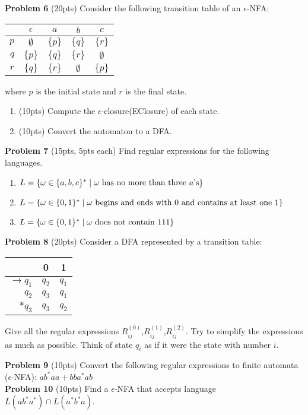 \documentclass{article}
\begin{document}
\noindent \textbf{Problem 6} (20pts) Consider the following transition table of an $\epsilon$-NFA:
    \begin{center}
    \small
        \begin{tabular}{r||c|c|c|c}
        & $\epsilon$ & $a$ & $b$ & $c$\\ \hline\hline
        $p$ & $\emptyset$ & $\{p\}$ & $\{q\}$ & $\{r\}$\\ 
        $q$ & $\{p\}$ & $\{q\}$ & $\{r\}$ & $\emptyset$\\ 
        $r$ & $\{q\}$ & $\{r\}$ & $\emptyset$ & $\{p\}$\\ 
        \end{tabular}
    \end{center}
    where $p$ is the initial state and $r$ is the final state.
    \begin{enumerate}
        \item (10pts) Compute the $\epsilon$-closure(EClosure) of each state.
        \item (10pts) Convert the automaton to a DFA.
    \end{enumerate}
    
\noindent \textbf{Problem 7} (15pts, 5pts each) Find regular expressions for the following languages.
\begin{enumerate}
    \item $L = \{ \omega \in \{ a,b,c \}^* \mid \omega \mbox{ has no more than three $a$'s} \}$
    \item $L = \{ \omega \in \{ 0,1 \}^* \mid \omega \mbox{ begins and ends with 0 and contains at least one 1} \}$
    \item $L = \{ \omega \in \{ 0,1 \}^* \mid \omega \mbox{ does not contain 111} \}$ 
\end{enumerate}

\noindent \textbf{Problem 8} (20pts) Consider a DFA represented by a transition table:
\begin{center}
\small
\begin{tabular}{r|c|c}
& 0 & 1 \\ \hline
$\rightarrow q_1$ & $q_2$ & $q_1$ \\ 
$q_2$ & $q_3$ & $q_1$ \\ 
$*q_3$ & $q_3$ & $q_2$
\end{tabular}
\end{center}
Give all the regular expressions $R^{(0)}_{ij}$,$R^{(1)}_{ij}$,$R^{(2)}_{ij}$. Try to simplify the expressions as much as possible.
Think of state $q_i$ as if it were the state with number $i$.

\noindent \newline \textbf{Problem 9} (10pts) Convert the following regular expressions to finite automata ($\epsilon$-NFA): $ab^*aa+bba^*ab$ \\

\noindent \textbf{Problem 10} (10pts) Find a $\epsilon$-NFA that accepts language $L(ab^*a^*)\cap L(a^*b^*a)$.
\end{document}
